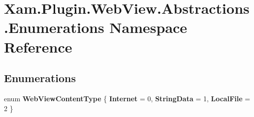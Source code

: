 \hypertarget{namespace_xam_1_1_plugin_1_1_web_view_1_1_abstractions_1_1_enumerations}{}\section{Xam.\+Plugin.\+Web\+View.\+Abstractions.\+Enumerations Namespace Reference}
\label{namespace_xam_1_1_plugin_1_1_web_view_1_1_abstractions_1_1_enumerations}
\subsection*{Enumerations}
\begin{DoxyCompactItemize}
\item 
\mbox{\label{namespace_xam_1_1_plugin_1_1_web_view_1_1_abstractions_1_1_enumerations_a4fd29b9755d42eb92ce5b9a48d35992e}} 
enum {\bfseries Web\+View\+Content\+Type} \{ {\bfseries Internet} = 0, 
{\bfseries String\+Data} = 1, 
{\bfseries Local\+File} = 2
 \}
\end{DoxyCompactItemize}
